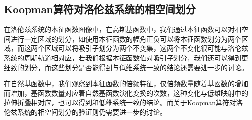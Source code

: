 \subsection{Koopman算符对洛伦兹系统的相空间划分}

在洛伦兹系统的本征函数图像中，在高斯基函数中，我们通过本征函数可以对相空间进行一定区域的划分，如使用本征函数的幅角正负可以将本征函数划分为两个区域，而这两个区域可以将吸引子划分为两个不变集，这两个不变化很可能与洛伦兹系统的周期轨道相对应，若我们根据本征函数值对吸引子划分，我们还可以得到更细致的划分，而这些划分是否能得到与低维系统一致的结论还需要进一步的讨论。

在自然基函数中，我们观察到本征函数的倍频特征，仅倍频数量随着基函数的增加而增加，基函数数量对应着自然基函数演化变换的次数，这种变化与低维映射中的拉伸折叠相对应，也可以得到和低维系统一致的结论。而关于Koopman算符对洛伦兹系统的相空间划分的验证则仍需要进一步的讨论。